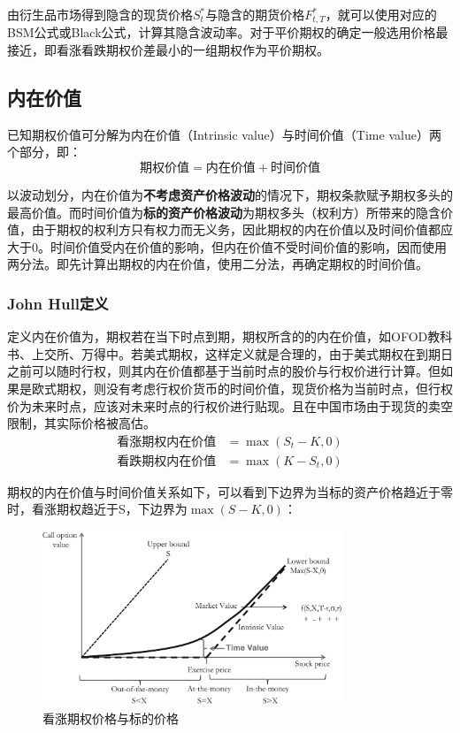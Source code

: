 \documentclass[11pt]{article}
\begin{document}
由衍生品市场得到隐含的现货价格$S^*_{t}$与隐含的期货价格$F^*_{t,T}$，就可以使用对应的BSM公式或Black公式，计算其隐含波动率。对于平价期权的确定一般选用价格最接近，即看涨看跌期权价差最小的一组期权作为平价期权。

\subsection{内在价值}

已知期权价值可分解为内在价值（Intrinsic value）与时间价值（Time value）两个部分，即：
\begin{equation*}
    \boxed{
        \text{期权价值} = \text{内在价值} + \text{时间价值}
    }
\end{equation*}

以波动划分，内在价值为\textbf{不考虑资产价格波动}的情况下，期权条款赋予期权多头的最高价值。而时间价值为\textbf{标的资产价格波动}为期权多头（权利方）所带来的隐含价值，由于期权的权利方只有权力而无义务，因此期权的内在价值以及时间价值都应大于0。时间价值受内在价值的影响，但内在价值不受时间价值的影响，因而使用两分法。即先计算出期权的内在价值，使用二分法，再确定期权的时间价值。

\subsubsection{John Hull定义}

定义内在价值为，期权若在当下时点到期，期权所含的的内在价值，如OFOD教科书、上交所、万得中。若美式期权，这样定义就是合理的，由于美式期权在到期日之前可以随时行权，则其内在价值都基于当前时点的股价与行权价进行计算。但如果是欧式期权，则没有考虑行权价货币的时间价值，现货价格为当前时点，但行权价为未来时点，应该对未来时点的行权价进行贴现。且在中国市场由于现货的卖空限制，其实际价格被高估。
\noindent\begin{align*}
    \text{看涨期权内在价值} & = \max(S_t-K,0) \\
    \text{看跌期权内在价值} & = \max(K-S_t,0)
\end{align*}

期权的内在价值与时间价值关系如下，可以看到下边界为当标的资产价格趋近于零时，看涨期权趋近于S，下边界为$\max(S-K,0)$：
\begin{figure}[H]
    \centering
    \includegraphics[width=0.8\textwidth]{fig/call-vs-stock.png}
    \caption{看涨期权价格与标的价格}
    \label{fig:call-vs-stock}
\end{figure}
\end{document}
